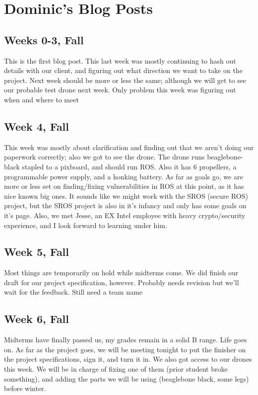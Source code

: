 \section{Dominic's Blog Posts}
\subsection{Weeks 0-3, Fall}
This is the first blog post. This last week was mostly continuing to hash out 
details with our client, and figuring out what direction we want to take on 
the project. Next week should be more or less the same; although we will get 
to see our probable test drone next week. Only problem this week was figuring 
out when and where to meet
\subsection{Week 4, Fall}
This week was mostly about clarification and finding out that we aren't doing 
our paperwork correctly; also we got to see the drone. The drone runs 
beaglebone-black stapled to a pixboard, and should run ROS. Also it has 6 
propellers, a programmable power supply, and a honking battery. 
As far as goals go, we are more or less set on finding/fixing vulnerabilities 
in ROS at this point, as it has nice known big ones. It sounds like we might 
work with the SROS (secure ROS) project, but the SROS project is also in it's 
infancy and only has some goals on it's page. Also, we met Jesse, an EX Intel 
employee with heavy crypto/security experience, and I look forward to learning 
under him.
\subsection{Week 5, Fall}
Most things are temporarily on hold while midterms come. We did finish our 
draft for our project specification, however. Probably needs revision but 
we'll wait for the feedback. Still need a team name
\subsection{Week 6, Fall}
Midterms have finally passed us, my grades remain in a solid B range. Life 
goes on. As far as the project goes, we will be meeting tonight to put the 
finisher on the project specifications, sign it, and turn it in. We also got 
access to our drones this week. We will be in charge of fixing one of them 
(prior student broke something), and adding the parts we will be using 
(beaglebone black, some legs) before winter.
